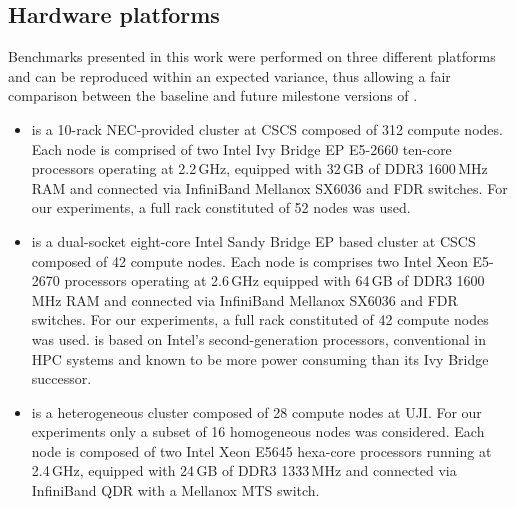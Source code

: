 \subsection{Hardware platforms}
\label{subsec:3.1}

Benchmarks presented  in this work  were performed on  three different
platforms  and can  be reproduced  within an  expected  variance, thus
allowing a  fair comparison between the baseline  and future milestone
versions of \cosmoart.

\begin{itemize}
\item \monch is a 10-rack NEC-provided clus\-ter at CSCS composed
  of 312 compute  nodes. %
  Each node is comprised of two Intel Ivy Bridge EP  E5-2660 ten-core processors
  operating at  2.2\,GHz, equipped with 32\,GB of DDR3 1600\,MHz  RAM and connected  via InfiniBand Mellanox  SX6036 and FDR switches. For our  experiments, 
  a full rack constituted of 52 nodes was used. %

\item \pilat is a dual-socket eight-core Intel Sandy
  Bridge EP based cluster at  CSCS composed of 42 compute nodes. %
  Each node is comprises two Intel Xeon E5-2670 processors operating  at 2.6\,GHz equipped with 64\,GB of DDR3 1600\,MHz RAM and connected  via InfiniBand Mellanox SX6036 and FDR switches. 
  For our  experiments, a full rack constituted of 42 compute nodes
  was used. \pilat  is based  on  Intel's second-generation
  processors, conventional in  HPC systems and known to  be more power
  consuming than its Ivy Bridge successor.

\item \tinto is  a heterogeneous cluster composed of
  28 compute nodes at UJI. For our  experiments only a subset of 16 homogeneous nodes was considered. Each node is composed of two Intel Xeon E5645 hexa-core processors 
  running at 2.4\,GHz, equipped with 24\,GB  of DDR3 1333\,MHz and connected via InfiniBand QDR with a Mellanox MTS switch. 

\end{itemize}

